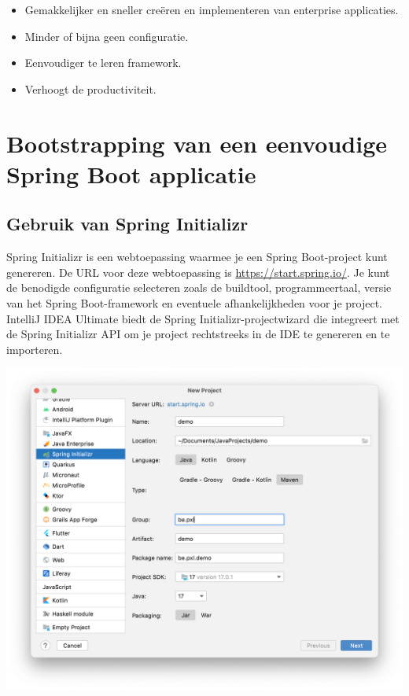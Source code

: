 \begin{itemize}
\item Gemakkelijker en sneller creëren en implementeren van enterprise applicaties.
\item Minder of bijna geen configuratie.
\item Eenvoudiger te leren framework.
\item Verhoogt de productiviteit.
\end{itemize}

\section{Bootstrapping van een eenvoudige Spring Boot applicatie}

\subsection{Gebruik van Spring Initializr}
Spring Initializr is een webtoepassing waarmee je een Spring Boot-project kunt genereren. De URL voor deze webtoepassing is \url{https://start.spring.io/}. Je kunt de benodigde configuratie selecteren zoals de buildtool,  programmeertaal,  versie van het Spring Boot-framework en eventuele afhankelijkheden voor je project.  IntelliJ IDEA Ultimate biedt de Spring Initializr-projectwizard die integreert met de Spring Initializr API om je project rechtstreeks in de IDE te genereren en te importeren.

\includegraphics[width=\textwidth]{./images/chapter1/spring_initializer_intellij.png}


